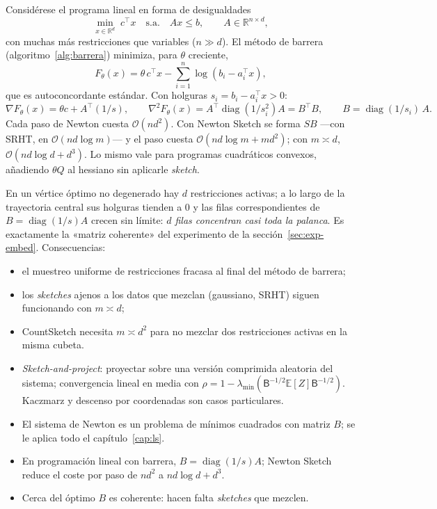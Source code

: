 \documentclass[11pt,a4paper,oneside]{book}
\theoremstyle{definition}
\theoremstyle{remark}
\newcommand{\R}{\mathbb{R}}
\newcommand{\E}{\mathbb{E}}
\newcommand{\cO}{\mathcal{O}}
\newcommand{\T}{^{\top}}
\DeclareMathOperator{\diag}{diag}
\begin{document}
Considérese el programa lineal en forma de desigualdades
\begin{equation}\label{eq:pl}
  \min_{x\in\R^d}\;c\T x\quad\text{s.a.}\quad Ax\le b,\qquad A\in\R^{n\times d},
\end{equation}
con muchas más restricciones que variables ($n\gg d$). El método de barrera (algoritmo~\ref{alg:barrera})
minimiza, para $\theta$ creciente,
\[ F_\theta(x)=\theta\,c\T x-\sum_{i=1}^n\log(b_i-a_i\T x), \]
que es autoconcordante estándar. Con holguras $s_i=b_i-a_i\T x>0$:
\[ \nabla F_\theta(x)=\theta c+A\T(1/s),\qquad\nabla^2F_\theta(x)=A\T\diag(1/s_i^2)A=B\T B,\qquad B=\diag(1/s_i)\,A . \]
Cada paso de Newton cuesta $\cO(nd^2)$. Con Newton Sketch se forma $SB$ ---con SRHT, en $\cO(nd\log m)$--- y
el paso cuesta $\cO(nd\log m+md^2)$; con $m\asymp d$, $\cO(nd\log d+d^3)$. Lo mismo vale para programas
cuadráticos convexos, añadiendo $\theta Q$ al hessiano sin aplicarle \emph{sketch}.

\begin{cuidado}
En un vértice óptimo no degenerado hay $d$ restricciones activas; a lo largo de la trayectoria central sus
holguras tienden a $0$ y las filas correspondientes de $B=\diag(1/s)A$ crecen sin límite: \emph{$d$ filas
concentran casi toda la palanca}. Es exactamente la «matriz coherente» del experimento de la
sección~\ref{sec:exp-embed}. Consecuencias:
\begin{itemize}
  \item el muestreo uniforme de restricciones fracasa al final del método de barrera;
  \item los \emph{sketches} ajenos a los datos que mezclan (gaussiano, SRHT) siguen funcionando con $m\asymp d$;
  \item CountSketch necesita $m\asymp d^2$ para no mezclar dos restricciones activas en la misma cubeta.
\end{itemize}
\end{cuidado}

\begin{resumen}
\begin{itemize}
  \item \emph{Sketch-and-project}: proyectar sobre una versión comprimida aleatoria del sistema; convergencia
        lineal en media con $\rho=1-\lambda_{\min}(\mathsf B^{-1/2}\E[Z]\mathsf B^{-1/2})$. Kaczmarz y descenso por coordenadas son casos particulares.
  \item El sistema de Newton es un problema de mínimos cuadrados con matriz $B$; se le aplica todo el capítulo~\ref{cap:ls}.
  \item En programación lineal con barrera, $B=\diag(1/s)A$; Newton Sketch reduce el coste por paso de $nd^2$ a $nd\log d+d^3$.
  \item Cerca del óptimo $B$ es coherente: hacen falta \emph{sketches} que mezclen.
\end{itemize}
\end{resumen}
\end{document}
